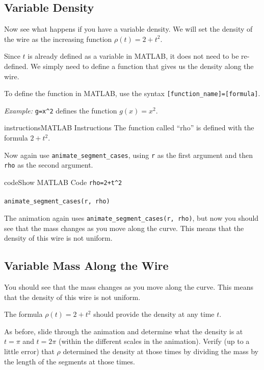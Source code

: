 \documentclass{ximera}
\begin{document}
\subsection*{Variable Density}

Now see what happens if you have a variable density. We will set the density of the wire as the increasing function $\rho(t) = 2 + t^2$.

Since $t$ is already defined as a variable in MATLAB, it does not need to be re-defined. We simply need to define a function that gives us the density along the wire.

\begin{remark}
To define the function in MATLAB, use the syntax \texttt{[function\_name]=[formula]}.

\textit{Example:} \texttt{g=x\^{}2} defines the function $g(x)=x^2$.
\end{remark}

\begin{expandable}{instructions}{MATLAB Instructions}
The function called ``rho'' is defined with the formula $2+t^2$.

Now again use \texttt{animate\_segment\_cases}, using \texttt{r} as the first argument and then \texttt{rho} as the second argument.
\end{expandable}

\begin{expandable}{code}{Show MATLAB Code}
\texttt{rho=2+t\^{}2}\\
\\
\texttt{animate\_segment\_cases(r, rho)}
\end{expandable}

The animation again uses \texttt{animate\_segment\_cases(r, rho)}, but now you should see that the mass changes as you move along the curve. This means that the density of this wire is not uniform.

\subsection*{Variable Mass Along the Wire}

You should see that the mass changes as you move along the curve. This means that the density of this wire is not uniform.

The formula $\rho(t) = 2 + t^2$ should provide the density at any time $t$. 

As before, slide through the animation and determine what the density is at $t=\pi$ and $t=2\pi$ (within the different scales in the animation). Verify (up to a little error) that $\rho$ determined the density at those times by dividing the mass by the length of the segments at those times.
\end{document}
